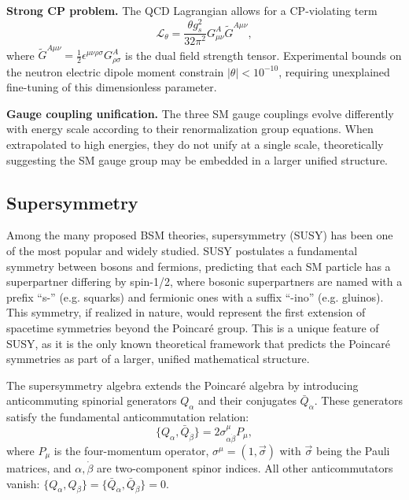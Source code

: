 \textbf{Strong CP problem.} The QCD Lagrangian allows for a CP-violating term
\begin{equation}
\mathcal{L}_{\theta} = \frac{\theta g_s^2}{32\pi^2} G^A_{\mu\nu} \tilde{G}^{A\mu\nu},
\end{equation}
where $\tilde{G}^{A\mu\nu} = \frac{1}{2}\epsilon^{\mu\nu\rho\sigma}G^A_{\rho\sigma}$ is the dual field strength tensor. Experimental bounds on the neutron electric dipole moment constrain $|\theta| < 10^{-10}$, requiring unexplained fine-tuning of this dimensionless parameter.

\textbf{Gauge coupling unification.} The three SM gauge couplings evolve differently with energy scale according to their renormalization group equations. When extrapolated to high energies, they do not unify at a single scale, theoretically suggesting the SM gauge group may be embedded in a larger unified structure.

\subsection{Supersymmetry}

Among the many proposed BSM theories, supersymmetry (SUSY) has been one of the most popular and widely studied. SUSY postulates a fundamental symmetry between bosons and fermions, predicting that each SM particle has a superpartner differing by spin-1/2, where bosonic superpartners are named with a prefix ``s-'' (e.g. squarks) and fermionic ones with a suffix ``-ino'' (e.g. gluinos). This symmetry, if realized in nature, would represent the first extension of spacetime symmetries beyond the Poincaré group. This is a unique feature of SUSY, as it is the only known theoretical framework that predicts the Poincaré symmetries as part of a larger, unified mathematical structure.

The supersymmetry algebra extends the Poincaré algebra by introducing anticommuting spinorial generators $Q_\alpha$ and their conjugates $\bar{Q}_{\dot{\alpha}}$. These generators satisfy the fundamental anticommutation relation:
\begin{equation}
\{Q_\alpha, \bar{Q}_{\dot{\beta}}\} = 2\sigma^\mu_{\alpha\dot{\beta}} P_\mu,
\end{equation}
where $P_\mu$ is the four-momentum operator, $\sigma^\mu = (1, \vec{\sigma})$ with $\vec{\sigma}$ being the Pauli matrices, and $\alpha, \dot{\beta}$ are two-component spinor indices. All other anticommutators vanish: $\{Q_\alpha, Q_\beta\} = \{\bar{Q}_{\dot{\alpha}}, \bar{Q}_{\dot{\beta}}\} = 0$.


